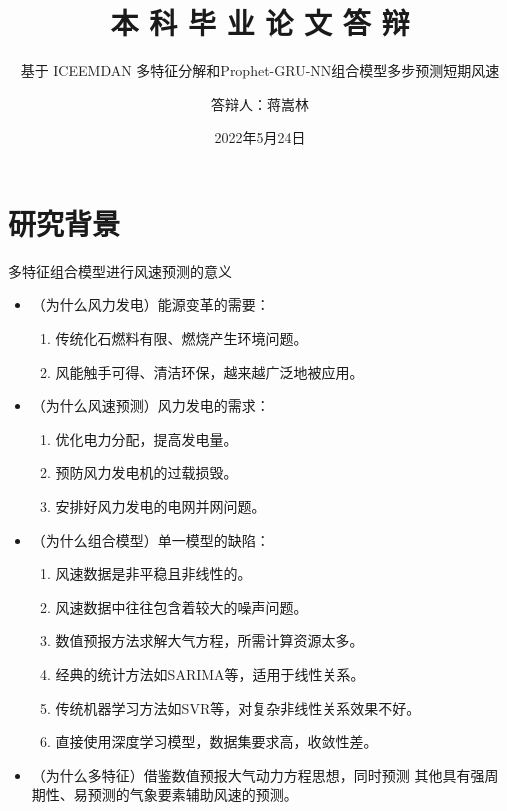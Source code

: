 \documentclass[14pt, AutoFakeBold]{ppt}
\title{本 科 毕 业 论 文 答 辩}
\subtitle{基于 ICEEMDAN 多特征分解和Prophet-GRU-NN组合模型多步预测短期风速}
\author{答辩人：蒋嵩林}
\institute{指导老师：任超}
\date{2022年5月24日}
\begin{document}
\maketitle


\section{研究背景}


\begin{frame}[c]{多特征组合模型进行风速预测的意义}
  \begin{itemize}
    \item （为什么风力发电）能源变革的需要：
    \begin{enumerate}
      \item 传统化石燃料有限、燃烧产生环境问题。
      \item 风能触手可得、清洁环保，越来越广泛地被应用。
    \end{enumerate}

    \item （为什么风速预测）风力发电的需求：
    \begin{enumerate}
      \item 优化电力分配，提高发电量。
      \item 预防风力发电机的过载损毁。
      \item 安排好风力发电的电网并网问题。
    \end{enumerate}

    \item （为什么组合模型）单一模型的缺陷：
    \begin{enumerate}
      \item 风速数据是非平稳且非线性的。
      \item 风速数据中往往包含着较大的噪声问题。
      \item 数值预报方法求解大气方程，所需计算资源太多。
      \item 经典的统计方法如SARIMA等，适用于线性关系。
      \item 传统机器学习方法如SVR等，对复杂非线性关系效果不好。
      \item 直接使用深度学习模型，数据集要求高，收敛性差。
    \end{enumerate}

    \item （为什么多特征）借鉴数值预报大气动力方程思想，同时预测
    其他具有强周期性、易预测的气象要素辅助风速的预测。
  \end{itemize}
\end{frame}
\end{document}
